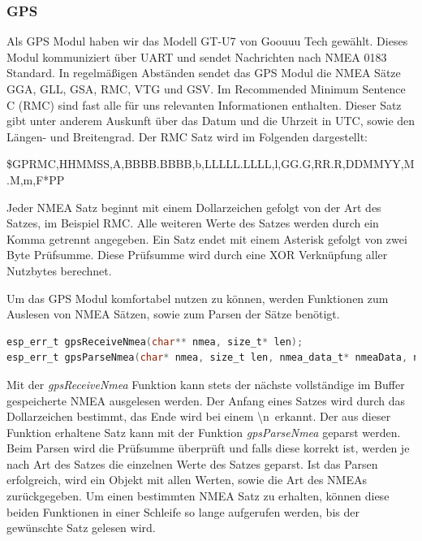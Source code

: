 \subsubsection{GPS}
Als GPS Modul haben wir das Modell GT-U7 von Goouuu Tech gewählt.
Dieses Modul kommuniziert über UART und sendet Nachrichten nach NMEA 0183 Standard.
In regelmäßigen Abständen sendet das GPS Modul die NMEA Sätze GGA, GLL, GSA, RMC, VTG und GSV.
Im Recommended Minimum Sentence C (RMC) sind fast alle für uns relevanten Informationen enthalten.
Dieser Satz gibt unter anderem Auskunft über das Datum und die Uhrzeit in UTC, sowie den Längen- und Breitengrad.
Der RMC Satz wird im Folgenden dargestellt:

\begin{center}
    \$GPRMC,HHMMSS,A,BBBB.BBBB,b,LLLLL.LLLL,l,GG.G,RR.R,DDMMYY,M.M,m,F*PP
\end{center}

Jeder NMEA Satz beginnt mit einem Dollarzeichen gefolgt von der Art des Satzes, im Beispiel RMC.
Alle weiteren Werte des Satzes werden durch ein Komma getrennt angegeben.
Ein Satz endet mit einem Asterisk gefolgt von zwei Byte Prüfsumme.
Diese Prüfsumme wird durch eine XOR Verknüpfung aller Nutzbytes berechnet.

Um das GPS Modul komfortabel nutzen zu können, werden Funktionen zum Auslesen von NMEA Sätzen, sowie zum Parsen der Sätze benötigt.

\begin{lstlisting}[language=C]
esp_err_t gpsReceiveNmea(char** nmea, size_t* len);
esp_err_t gpsParseNmea(char* nmea, size_t len, nmea_data_t* nmeaData, nmea_data_type_t* nmeaDataType);
\end{lstlisting}

Mit der \textit{gpsReceiveNmea} Funktion kann stets der nächste vollständige im Buffer gespeicherte NMEA ausgelesen werden.
Der Anfang eines Satzes wird durch das Dollarzeichen bestimmt, das Ende wird bei einem \glqq \textbackslash n\grqq\ erkannt.
Der aus dieser Funktion erhaltene Satz kann mit der Funktion \textit{gpsParseNmea} geparst werden.
Beim Parsen wird die Prüfsumme überprüft und falls diese korrekt ist, werden je nach Art des Satzes die einzelnen Werte des Satzes geparst.
Ist das Parsen erfolgreich, wird ein Objekt mit allen Werten, sowie die Art des NMEAs zurückgegeben.
Um einen bestimmten NMEA Satz zu erhalten, können diese beiden Funktionen in einer Schleife so lange aufgerufen werden, bis der gewünschte Satz gelesen wird.

